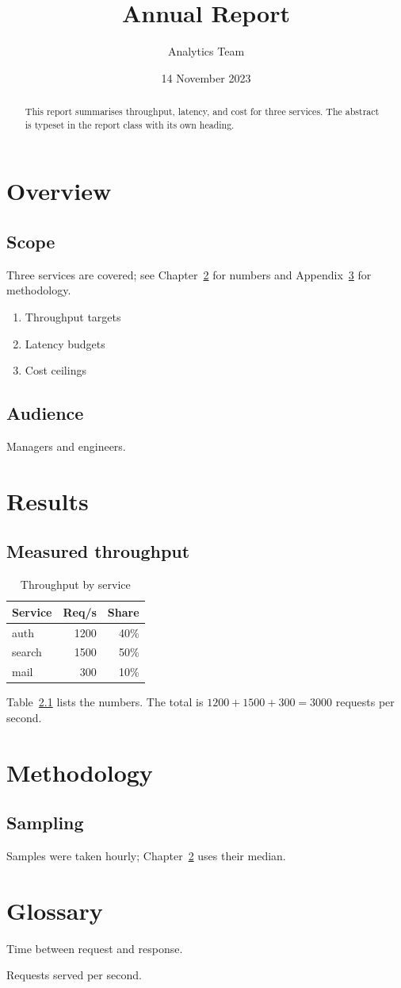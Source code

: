\documentclass[11pt]{report}
\title{Annual Report}\author{Analytics Team}\date{14 November 2023}
\begin{document}
\maketitle
\begin{abstract}
This report summarises throughput, latency, and cost for three services.
The abstract is typeset in the report class with its own heading.
\end{abstract}
\tableofcontents
\listoftables
\chapter{Overview}\label{ch:overview}
\section{Scope}
Three services are covered; see Chapter~\ref{ch:results} for numbers and
Appendix~\ref{app:method} for methodology.
\begin{enumerate}[label=\textbf{R\arabic*.},leftmargin=*]
  \item Throughput targets
  \item Latency budgets
  \item Cost ceilings
\end{enumerate}
\section{Audience}
Managers and engineers.
\chapter{Results}\label{ch:results}
\section{Measured throughput}
\begin{table}[ht]\centering
\caption{Throughput by service}\label{tab:tp}
\begin{tabular}{@{}lrr@{}}\toprule Service & Req/s & Share\\\midrule
auth & 1200 & 40\%\\ search & 1500 & 50\%\\ mail & 300 & 10\%\\\bottomrule\end{tabular}
\end{table}
Table~\ref{tab:tp} lists the numbers. The total is $1200+1500+300=3000$ requests per second.
\appendix
\chapter{Methodology}\label{app:method}
\section{Sampling}
Samples were taken hourly; Chapter~\ref{ch:results} uses their median.
\chapter{Glossary}
\begin{description}[style=nextline]
  \item[Latency] Time between request and response.
  \item[Throughput] Requests served per second.
\end{description}
\end{document}
